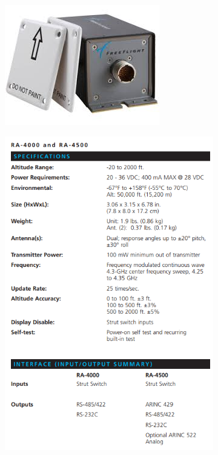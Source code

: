 	\begin{figure}[H]
	\centering
	  \begin{subfigure}[b]{0.32\textwidth}
	  \includegraphics[width=\textwidth]{./images/RA4000.png}
	  \caption{}
	  \label{1diag1}
	  \end{subfigure}
	  \qquad %
	  \begin{subfigure}[b]{0.6\textwidth}
	  \includegraphics[width=\textwidth]{./images/RA4000Specs.png}

\end{subfigure}
\end{figure}
